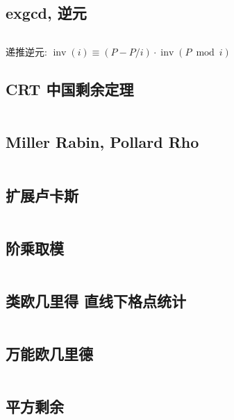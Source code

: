 \documentclass[titlepage, a4paper]{article}
\begin{document}
\begin{multicols}{2}
\begin{spacing}{0.6}
				\subsection{exgcd, 逆元}
					\inputminted{cpp}{src/Math/exgcd.cpp}
					递推逆元: $\operatorname{inv}(i) \equiv (P - P / i) \cdot \operatorname{inv}(P \bmod i)$
				\subsection{CRT 中国剩余定理}
					\inputminted{cpp}{src/Math/CRT_lbn.cpp}
				\subsection{Miller Rabin, Pollard Rho}
					\inputminted{cpp}{src/Math/Miller Rabin And Pollard Rho.cpp}
				\subsection{扩展卢卡斯}
					\inputminted{cpp}{src/Math/扩展卢卡斯.cpp}
				\subsection{阶乘取模}
					\inputminted{cpp}{src/Math/Factorial Mod.cpp}
				\subsection{类欧几里得 直线下格点统计}
					\inputminted{cpp}{src/Math/直线下格点统计.cpp}
				\subsection{万能欧几里德}
					\inputminted{cpp}{src/zjj/euclid.cpp}
				\subsection{平方剩余}
					\inputminted{cpp}{src/Math/平方剩余.cpp}

\end{spacing}
\end{multicols}
\end{document}

